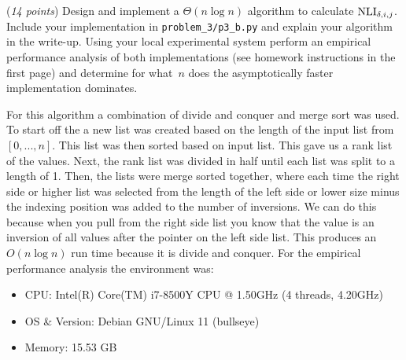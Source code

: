 \documentclass{hw}
\begin{document}
\begin{problem}
        \begin{subproblem}
            (\textit{14 points})
            Design and implement a $\Theta(n\log n)$ algorithm to calculate $\textrm{NLI}_{\delta,i,j}$. Include your implementation in \texttt{problem\_3/p3\_b.py} and explain your algorithm in the write-up. Using your local experimental system perform an empirical performance analysis of both implementations (see homework instructions in the first page) and determine for what~$n$ does the asymptotically faster implementation dominates.
        \end{subproblem}

        \begin{solution}
            For this algorithm a combination of divide and conquer and merge sort was used. To start off the a new list was created based on the length of the input list from $[0,...,n]$. This list was then sorted based on input list. This gave us a rank list of the values. Next, the rank list was divided in half until each list was split to a length of 1. Then, the lists were merge sorted together, where each time the right side or higher list was selected from the length of the left side or lower size minus the indexing position was added to the number of inversions. We can do this because when you pull from the right side list you know that the value is an inversion of all values after the pointer on the left side list. This produces an $O(n\log n)$ run time because it is divide and conquer. 
            For the empirical performance analysis the environment was:
                \begin{itemize}
                    \item CPU: Intel(R) Core(TM) i7-8500Y CPU @ 1.50GHz (4 threads, 4.20GHz)
                    \item OS \& Version: Debian GNU/Linux 11 (bullseye)
                    \item Memory: 15.53 GB
                \end{itemize}
                    

\end{solution}
\end{problem}
\end{document}
